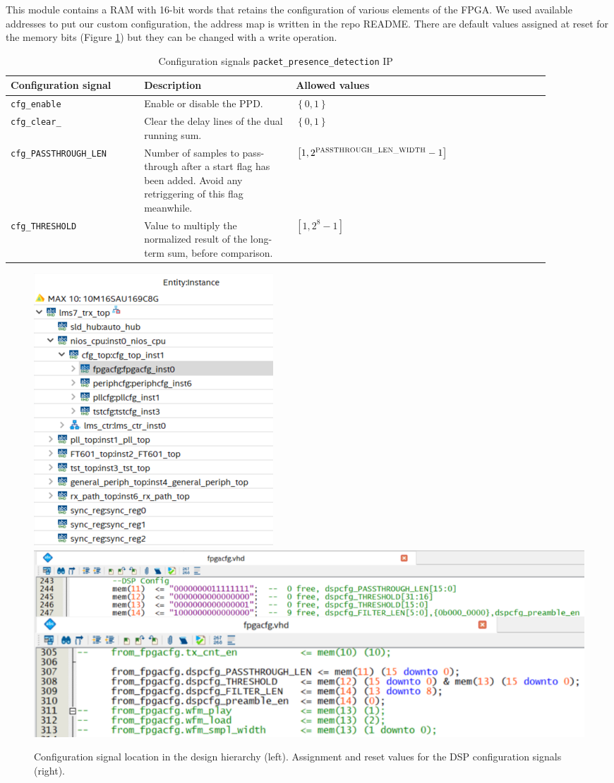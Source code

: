 This module contains a RAM with 16-bit words that retains the configuration of various elements of the FPGA. We used available addresses to put our custom configuration, the address map is written in the repo README. There are default values assigned at reset for the memory bits (Figure \ref{fig:design_hier_fpgacfg}) but they can be changed with a write operation.

\begin{table}[!h]
\centering
\begin{tabular}{|p{0.22\linewidth}|p{0.25\linewidth}|p{0.34\linewidth}|p{0.08\linewidth}|}
\hline
Configuration signal & Description & Allowed values\\
\hline
\texttt{cfg\_enable} & Enable or disable the PPD. & $\left\{0,1\right\}$ \\
\hline
\texttt{cfg\_clear\_} & Clear the delay lines of the dual running sum. & $\left\{0,1\right\}$ \\
\hline
\texttt{cfg\_PASSTHROUGH\_LEN} & Number of samples to pass-through after a start flag has been added. Avoid any retriggering of this flag meanwhile. & $\left[1,2^{\textsc{PASSTHROUGH\_LEN\_WIDTH}}-1\right]$ \\
\hline
\texttt{cfg\_THRESHOLD} & Value to multiply the normalized result of the long-term sum, before comparison. & $\left[1,2^{8}-1\right]$ \\
\hline
\end{tabular}
\caption{Configuration signals \texttt{packet\_presence\_detection} IP}
\label{table:pd_soft_param}
\end{table}

\begin{figure}[!h]
    \centering
    \includegraphics[width=0.3\linewidth]{figures/design_hierarchy_fpgacfg.PNG}
    \includegraphics[width=0.6\linewidth]{figures/design_hierarchy_fpgacfg_both.PNG}
    \caption{Configuration signal location in the design hierarchy (left). Assignment and reset values for the DSP configuration signals (right).}
    \label{fig:design_hier_fpgacfg}
\end{figure}

